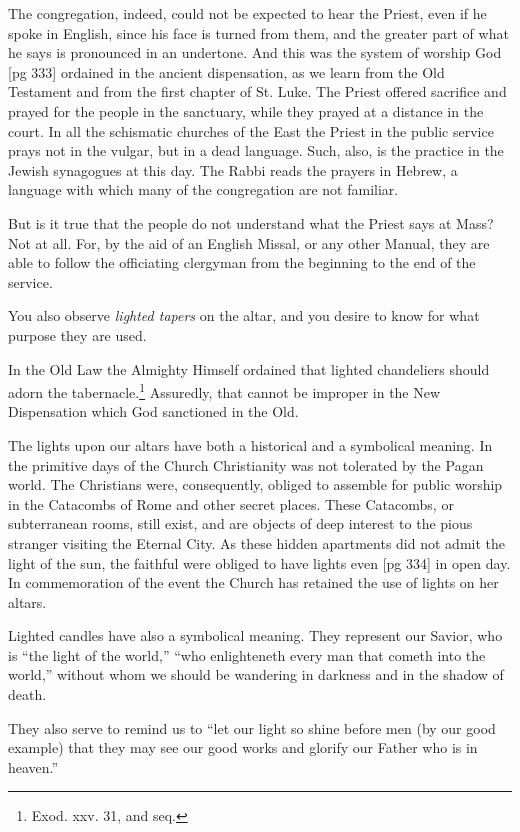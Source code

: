 The congregation, indeed, could not be expected
to hear the Priest, even if he spoke in English,
since his face is turned from them, and the greater
part of what he says is pronounced in an undertone.
And this was the system of worship God
[pg 333]
ordained in the ancient dispensation, as we learn
from the Old Testament and from the first chapter
of St. Luke. The Priest offered sacrifice and
prayed for the people in the sanctuary, while they
prayed at a distance in the court. In all the
schismatic churches of the East the Priest in the
public service prays not in the vulgar, but in a
dead language. Such, also, is the practice in the
Jewish synagogues at this day. The Rabbi reads
the prayers in Hebrew, a language with which
many of the congregation are not familiar.

But is it true that the people do not understand
what the Priest says at Mass? Not at all. For,
by the aid of an English Missal, or any other
Manual, they are able to follow the officiating
clergyman from the beginning to the end of the
service.

You also observe \emph{lighted tapers} on the altar, and
you desire to know for what purpose they are
used.

In the Old Law the Almighty Himself ordained
that lighted chandeliers should adorn the tabernacle.\footnote{Exod.
xxv. 31, and seq.}
Assuredly, that cannot be improper in
the New Dispensation which God sanctioned in the
Old.

The lights upon our altars have both a historical
and a symbolical meaning. In the primitive
days of the Church Christianity was not tolerated
by the Pagan world. The Christians were,
consequently, obliged to assemble for public worship
in the Catacombs of Rome and other secret
places. These Catacombs, or subterranean rooms,
still exist, and are objects of deep interest to the
pious stranger visiting the Eternal City. As these
hidden apartments did not admit the light of the
sun, the faithful were obliged to have lights even
[pg 334]
in open day. In commemoration of the event the
Church has retained the use of lights on her altars.

Lighted candles have also a symbolical meaning.
They represent our Savior, who is “the light of
the world,” “who enlighteneth every man that
cometh into the world,” without whom we should
be wandering in darkness and in the shadow of
death.

They also serve to remind us to “let our light
so shine before men (by our good example) that
they may see our good works and glorify our
Father who is in heaven.”

